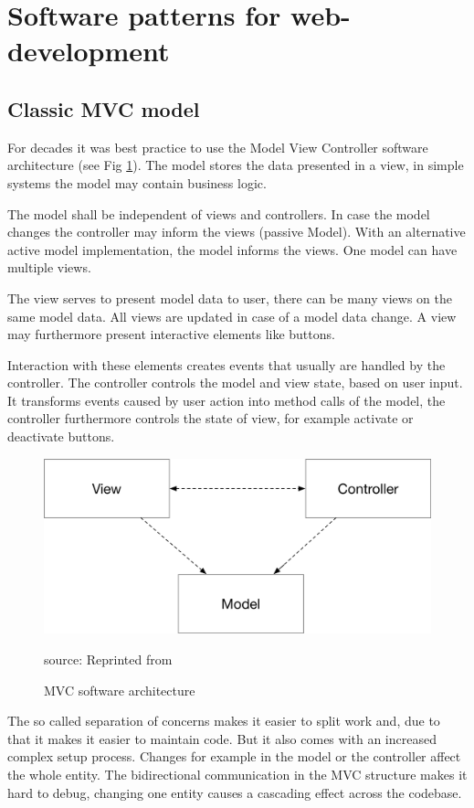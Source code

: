 \newpage

\section{Software patterns for web-development}

\subsection{Classic MVC model}
For decades it was best practice to use the Model View Controller software architecture (see Fig \ref{fig:MVC}). The model stores the data presented in a view, in simple systems the model may contain business logic.

The model shall be independent of views and controllers. In case the model changes the controller may inform the views (passive Model). With an alternative active model implementation, the model informs the views. One model can have multiple views.
 
The view serves to present model data to user, there can be many views on the same model data. All views are updated in case of a model data change. A view may furthermore present interactive elements like buttons. 
 
Interaction with these elements creates events that usually are handled by the controller. The controller controls the model and view state, based on user input. It transforms events caused by user action into method calls of the model, the controller furthermore controls the state of view, for example activate or deactivate buttons. \cite{GOLL}


\begin{figure}[H]
	\centering
	\includegraphics[width=0.8\linewidth]{bilder/grundlagen/MVC.png}
	\caption{MVC  software architecture} source: Reprinted from \cite{GOLL}
	\label{fig:MVC}
\end{figure}


The so called separation of concerns makes it easier to split work and, due to that it makes it easier to maintain code. But it also comes with an increased complex setup process. Changes for example in the model or the controller affect the whole entity. The bidirectional communication in the MVC structure makes it hard to debug, changing one entity  causes a cascading effect across the codebase.

